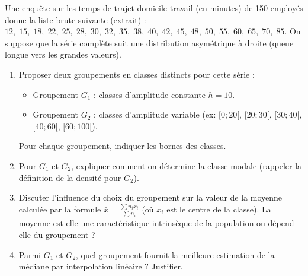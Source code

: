 \documentclass[11pt]{article}
\begin{document}
\begin{exercice}
Une enquête sur les temps de trajet domicile-travail (en minutes) de \num{150} employés donne la liste brute suivante (extrait) : 
$12,\; 15,\; 18,\; 22,\; 25,\; 28,\; 30,\; 32,\; 35,\; 38,\; 40,\; 42,\; 45,\; 48,\; 50,\; 55,\; 60,\; 65,\; 70,\; 85$.
On suppose que la série complète suit une distribution asymétrique à droite (queue longue vers les grandes valeurs).

\begin{enumerate}
    \item Proposer deux groupements en classes distincts pour cette série :
    \begin{itemize}
        \item Groupement $G_1$ : classes d'amplitude constante $h=10$.
        \item Groupement $G_2$ : classes d'amplitude variable (ex: $[0;20[$, $[20;30[$, $[30;40[$, $[40;60[$, $[60;100[$).
    \end{itemize}
    Pour chaque groupement, indiquer les bornes des classes.
    \item Pour $G_1$ et $G_2$, expliquer comment on détermine la classe modale (rappeler la définition de la densité pour $G_2$).
    \item Discuter l'influence du choix du groupement sur la valeur de la moyenne calculée par la formule $\bar{x} = \frac{\sum n_i x_i}{\sum n_i}$ (où $x_i$ est le centre de la classe). La moyenne est-elle une caractéristique intrinsèque de la population ou dépend-elle du groupement ?
    \item Parmi $G_1$ et $G_2$, quel groupement fournit la meilleure estimation de la médiane par interpolation linéaire ? Justifier.
\end{enumerate}
\end{exercice}
\end{document}
